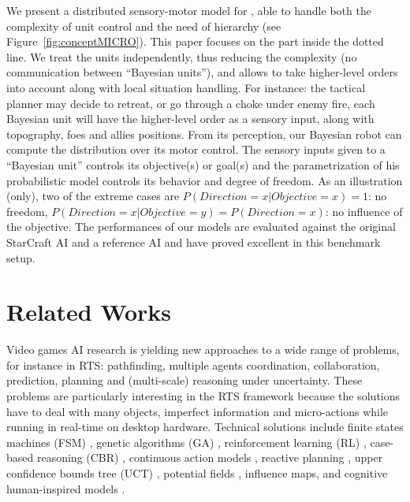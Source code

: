 We present a distributed sensory-motor model for , able to handle both the complexity of unit control and the need of hierarchy (see Figure~\ref{fig:conceptMICRO}). This paper focuses on the part inside the dotted line. We treat the units independently, thus reducing the complexity (no communication between ``Bayesian units''), and allows to take higher-level orders into account along with local situation handling. For instance: the tactical planner may decide to retreat, or go through a choke under enemy fire, each Bayesian unit will have the higher-level order as a sensory input, along with topography, foes and allies positions. From its perception, our Bayesian robot \cite{Lebeltel04} can compute the distribution over its motor control. The sensory inputs given to a ``Bayesian unit'' controls its objective(s) or goal(s) and the parametrization of his probabilistic model controls its behavior and degree of freedom. As an illustration (only), two of the extreme cases are $P(Direction=x|Objective=x)=1$: no freedom, $P(Direction=x|Objective=y)=P(Direction=x)$: no influence of the objective. The performances of our models are evaluated against the original StarCraft AI and a reference AI and have proved excellent in this benchmark setup.


\section{Related Works}

Video games AI research is yielding new approaches to a wide range of problems, for instance in RTS: pathfinding, multiple agents coordination, collaboration, prediction, planning and (multi-scale) reasoning under uncertainty. These problems are particularly interesting in the RTS framework because the solutions have to deal with many objects, imperfect information and micro-actions while running in real-time on desktop hardware. Technical solutions include finite states machines (FSM) \citep{FSM}, genetic algorithms (GA) \citep{GA,teamCompositionRTS}, reinforcement learning (RL) \citep{Marthi05concurrenthierarchical,Madeira06}, case-based reasoning (CBR) \citep{LTW,CBR-RL}, continuous action models \citep{Molineaux08}, reactive planning \citep{WeberCIG10}, upper confidence bounds tree (UCT) \citep{UCT}, potential fields \citep{Hagelback2009}, influence maps\citep{teamCompositionRTS}, and cognitive human-inspired models \citep{SORTS}.

